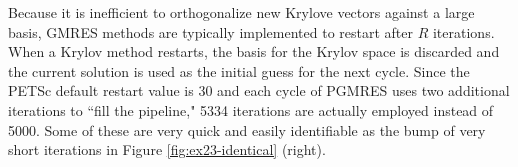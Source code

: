\documentclass[sigconf]{acmart}
\begin{document}
Because it is inefficient to orthogonalize new Krylove vectors against a large basis, GMRES methods are typically implemented to restart after $R$ iterations. When a Krylov method restarts, the basis for the Krylov space is discarded and the current solution is used as the initial guess for the next cycle.
Since the PETSc default restart value is $30$ and each cycle of PGMRES uses two additional iterations to ``fill the pipeline," 5334 iterations are actually employed instead of 5000. Some of these are very quick and easily identifiable as the bump of very short iterations in Figure \ref{fig:ex23-identical} (right). 

\end{document}
